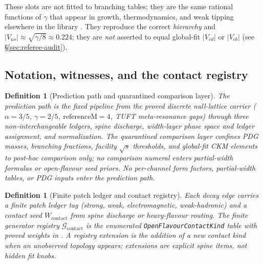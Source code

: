 \documentclass[11pt]{amsart}
\newcommand{\leanrepo}{https://github.com/HQIV/hqiv-lean/blob/main}
\newcommand{\leanfile}[1]{\href{\leanrepo/#1}{\footnotesize\path{#1}}}
\newtheorem{definition}[theorem]{Definition}
\begin{document}
These slots are not fitted to branching tables; they are the same rational
functions of $\gamma$ that appear in growth, thermodynamics, and weak tipping
elsewhere in the library \cite{hqiv-3d-growth-paper,hqiv-oct-action-paper}.
They reproduce the correct \emph{hierarchy} and $|V_{us}|\approx\sqrt{\gamma/8}
\approx 0.224$; they are \emph{not} asserted to equal global-fit $|V_{cd}|$ or
$|V_{cb}|$ (see \S\ref{sec:referee-audit}).

\subsection{Notation, witnesses, and the contact registry}
\label{sec:notation}

\begin{definition}[Prediction path and quarantined comparison layer]
\label{def:prediction-comparison}
The \emph{prediction path} is the fixed pipeline from the proved discrete
null-lattice carrier ($\alpha=3/5$, $\gamma=2/5$, $\mathrm{referenceM}=4$,
TUFT meta-resonance gaps) through three non-interchangeable ledgers, spine
discharge, width-layer phase space and ledger assignment, and normalization.
The \emph{quarantined comparison layer} confines PDG masses, branching fractions,
facility $\sqrt{s}$ thresholds, and global-fit CKM elements to post-hoc comparison
only; no comparison numeral enters partial-width formulas or open-flavour seed
priors.
No per-channel form factors, partial-width tables, or PDG inputs enter the
prediction path.
\end{definition}

\begin{definition}[Finite patch ledger and contact registry]
\label{def:contact-registry}
Each decay edge carries a finite \emph{patch ledger} tag (strong, weak,
electromagnetic, weak-hadronic) and a \emph{contact seed}
$W_{\mathrm{contact}}$ from spine discharge or heavy-flavour routing.
The finite generator registry $\mathcal{G}_{\mathrm{contact}}$ is the
enumerated \texttt{OpenFlavourContactKind} table with proved weights in
\leanfile{Hqiv/Physics/HepDecayReadout.lean}.
A \emph{registry extension} is the addition of a new contact kind when an
unobserved topology appears; extensions are explicit spine items, not hidden fit
knobs.
\end{definition}
\end{document}
